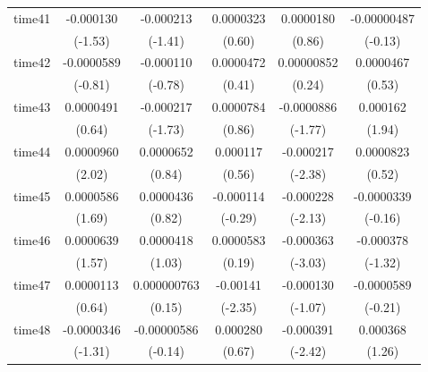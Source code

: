 \begin{table}[htbp]
\begin{tabular}{l*{5}{c}}
time41      &   -0.000130         &   -0.000213         &   0.0000323         &   0.0000180         & -0.00000487         \\
            &     (-1.53)         &     (-1.41)         &      (0.60)         &      (0.86)         &     (-0.13)         \\
time42      &  -0.0000589         &   -0.000110         &   0.0000472         &  0.00000852         &   0.0000467         \\
            &     (-0.81)         &     (-0.78)         &      (0.41)         &      (0.24)         &      (0.53)         \\
time43      &   0.0000491         &   -0.000217         &   0.0000784         &  -0.0000886         &    0.000162         \\
            &      (0.64)         &     (-1.73)         &      (0.86)         &     (-1.77)         &      (1.94)         \\
time44      &   0.0000960\sym{*}  &   0.0000652         &    0.000117         &   -0.000217\sym{*}  &   0.0000823         \\
            &      (2.02)         &      (0.84)         &      (0.56)         &     (-2.38)         &      (0.52)         \\
time45      &   0.0000586         &   0.0000436         &   -0.000114         &   -0.000228\sym{*}  &  -0.0000339         \\
            &      (1.69)         &      (0.82)         &     (-0.29)         &     (-2.13)         &     (-0.16)         \\
time46      &   0.0000639         &   0.0000418         &   0.0000583         &   -0.000363\sym{**} &   -0.000378         \\
            &      (1.57)         &      (1.03)         &      (0.19)         &     (-3.03)         &     (-1.32)         \\
time47      &   0.0000113         & 0.000000763         &    -0.00141\sym{*}  &   -0.000130         &  -0.0000589         \\
            &      (0.64)         &      (0.15)         &     (-2.35)         &     (-1.07)         &     (-0.21)         \\
time48      &  -0.0000346         & -0.00000586         &    0.000280         &   -0.000391\sym{*}  &    0.000368         \\
            &     (-1.31)         &     (-0.14)         &      (0.67)         &     (-2.42)         &      (1.26)         \\

\end{tabular}
\end{table}
